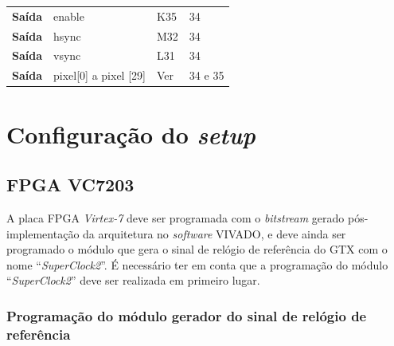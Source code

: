 \documentclass[11pt,a4paper]{article}
\begin{document}
\begin{table}[h!]
\begin{tabular}{rlll}
			\multicolumn{1}{r|}{\textbf{Saída}}   & enable                                 & K35                                      & 34                                         \\
			\multicolumn{1}{r|}{\textbf{Saída}}   & hsync                                  & M32                                      & 34                                         \\
			\multicolumn{1}{r|}{\textbf{Saída}}   & vsync                                  & L31                                      & 34                                         \\
			\multicolumn{1}{r|}{\textbf{Saída}}   & pixel{[}0{]} a pixel {[}29{]}          & Ver \cite{R041}                                & 34 e 35                                    \\ \hline
		\end{tabular}
	\end{table}
	

	\section{Configuração do \textit{setup}}
	
	\subsection{FPGA VC7203}
	
	A placa FPGA \textit{Virtex-7} deve ser programada com o \textit{bitstream} gerado pós-implementação da arquitetura no \textit{software} VIVADO, e deve ainda ser programado o módulo que gera o sinal de relógio de referência do GTX com o nome ``\textit{SuperClock2}''. É necessário ter em conta que a programação do módulo  ``\textit{SuperClock2}'' deve ser realizada em primeiro lugar.
	
	\subsubsection{Programação do módulo gerador do sinal de relógio de referência}
\end{document}

